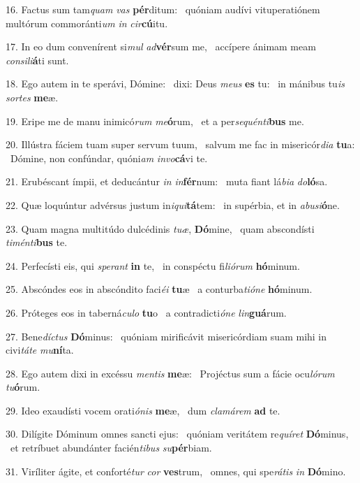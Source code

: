16. Factus sum tam\textit{quam} \textit{vas} \textbf{pér}ditum: \ast\  quóniam audívi vituperatiónem multórum commoránti\textit{um} \textit{in} \textit{cir}\textbf{cú}itu.\

17. In eo dum convenírent si\textit{mul} \textit{ad}\textbf{vér}sum me, \ast\  accípere ánimam meam \textit{con}\textit{si}\textit{li}\textbf{á}ti sunt.\

18. Ego autem in te sperávi, Dómine: \dag\  dixi: Deus \textit{me}\textit{us} \textbf{es} tu: \ast\  in mánibus tu\textit{is} \textit{sor}\textit{tes} \textbf{me}æ.\

19. Eripe me de manu inimicó\textit{rum} \textit{me}\textbf{ó}rum, \ast\  et a per\textit{se}\textit{quén}\textit{ti}\textbf{bus} me.\

20. Illústra fáciem tuam super servum tuum, \dag\  salvum me fac in misericór\textit{di}\textit{a} \textbf{tu}a: \ast\  Dómine, non confúndar, quóni\textit{am} \textit{in}\textit{vo}\textbf{cá}vi te.\

21. Erubéscant ímpii, et deducántur \textit{in} \textit{in}\textbf{fér}num: \ast\  muta fiant lá\textit{bi}\textit{a} \textit{do}\textbf{ló}sa.\

22. Quæ loquúntur advérsus justum in\textit{i}\textit{qui}\textbf{tá}tem: \ast\  in supérbia, et in \textit{ab}\textit{u}\textit{si}\textbf{ó}ne.\

23. Quam magna multitúdo dulcédinis \textit{tu}\textit{æ}, \textbf{Dó}mine, \ast\  quam abscondísti \textit{ti}\textit{mén}\textit{ti}\textbf{bus} te.\

24. Perfecísti eis, qui \textit{spe}\textit{rant} \textbf{in} te, \ast\  in conspéctu fi\textit{li}\textit{ó}\textit{rum} \textbf{hó}minum.\

25. Abscóndes eos in abscóndito faci\textit{é}\textit{i} \textbf{tu}æ \ast\  a conturba\textit{ti}\textit{ó}\textit{ne} \textbf{hó}minum.\

26. Próteges eos in taberná\textit{cu}\textit{lo} \textbf{tu}o \ast\  a contradicti\textit{ó}\textit{ne} \textit{lin}\textbf{guá}rum.\

27. Bene\textit{díc}\textit{tus} \textbf{Dó}minus: \ast\  quóniam mirificávit misericórdiam suam mihi in civi\textit{tá}\textit{te} \textit{mu}\textbf{ní}ta.\

28. Ego autem dixi in excéssu \textit{men}\textit{tis} \textbf{me}æ: \ast\  Projéctus sum a fácie ocu\textit{ló}\textit{rum} \textit{tu}\textbf{ó}rum.\

29. Ideo exaudísti vocem orati\textit{ó}\textit{nis} \textbf{me}æ, \ast\  dum \textit{cla}\textit{má}\textit{rem} \textbf{ad} te.\

30. Dilígite Dóminum omnes sancti ejus: \dag\  quóniam veritátem re\textit{quí}\textit{ret} \textbf{Dó}minus, \ast\  et retríbuet abundánter facién\textit{ti}\textit{bus} \textit{su}\textbf{pér}biam.\

31. Viríliter ágite, et conforté\textit{tur} \textit{cor} \textbf{ves}trum, \ast\  omnes, qui spe\textit{rá}\textit{tis} \textit{in} \textbf{Dó}mino.\

